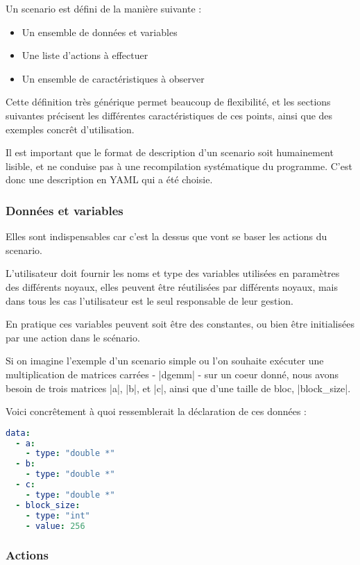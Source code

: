 Un scenario est défini de la manière suivante :
\begin{itemize}
 \item Un ensemble de données et variables
 \item Une liste d'actions à effectuer
 \item Un ensemble de caractéristiques à observer
\end{itemize}

Cette définition très générique permet beaucoup de flexibilité, et les sections suivantes précisent les différentes caractéristiques de ces points, ainsi que des exemples concrêt d'utilisation.

Il est important que le format de description d'un scenario soit humainement lisible, et ne conduise pas à une recompilation systématique du programme. C'est donc une description en YAML qui a été choisie.

\subsubsection{Données et variables}

Elles sont indispensables car c'est la dessus que vont se baser les actions du scenario.

L'utilisateur doit fournir les noms et type des variables utilisées en paramètres des différents noyaux, elles peuvent être réutilisées par différents noyaux, mais dans tous les cas l'utilisateur est le seul responsable de leur gestion.

En pratique ces variables peuvent soit être des constantes, ou bien être initialisées par une action dans le scénario.

Si on imagine l'exemple d'un scenario simple ou l'on souhaite exécuter une multiplication de matrices carrées - |dgemm| - sur un coeur donné, nous avons besoin de trois matrices |a|, |b|, et |c|, ainsi que d'une taille de bloc, |block_size|.

Voici concrêtement à quoi ressemblerait la déclaration de ces données :

\begin{lstlisting}[language=yaml,caption=Exemple de déclaration de variables,label=lst:tool:data-example]
data:
  - a:
    - type: "double *"
  - b:
    - type: "double *"
  - c:
    - type: "double *"
  - block_size:
    - type: "int"
    - value: 256
\end{lstlisting}

\subsubsection{Actions}

